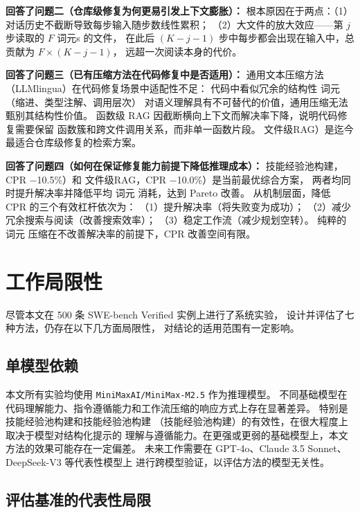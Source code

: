 \textbf{回答了问题二（仓库级修复为何更易引发上下文膨胀）：}
根本原因在于两点：（1）对话历史不截断导致每步输入随步数线性累积；
（2）大文件的放大效应——第 $j$ 步读取的 $F$ 词元s 的文件，
在此后 $(K-j-1)$ 步中每步都会出现在输入中，总贡献为 $F \times (K-j-1)$，
远超一次阅读本身的代价。

\textbf{回答了问题三（已有压缩方法在代码修复中是否适用）：}
通用文本压缩方法（LLMlingua）在代码修复场景中适配性不足：
代码中看似冗余的结构性 词元（缩进、类型注解、调用层次）
对语义理解具有不可替代的价值，通用压缩无法甄别其结构性价值。
函数级 RAG 因截断横向上下文而解决率下降，说明代码修复需要保留
函数簇和跨文件调用关系，而非单一函数片段。
文件级RAG）是迄今最适合仓库级修复的检索方案。

\textbf{回答了问题四（如何在保证修复能力前提下降低推理成本）：}
技能经验池构建，CPR $-$10.5\%）和
文件级RAG，CPR $-$10.0\%）是当前最优综合方案，
两者均同时提升解决率并降低平均 词元 消耗，达到 Pareto 改善。
从机制层面，降低 CPR 的三个有效杠杆依次为：
（1）提升解决率（将失败变为成功）；
（2）减少冗余搜索与阅读（改善搜索效率）；
（3）稳定工作流（减少规划空转）。
纯粹的 词元 压缩在不改善解决率的前提下，CPR 改善空间有限。


\section{工作局限性}
\label{sec:limitations}

尽管本文在 500 条 SWE-bench Verified 实例上进行了系统实验，
设计并评估了七种方法，仍存在以下几方面局限性，
对结论的适用范围有一定影响。

\subsection{单模型依赖}
\label{subsec:limit-single-model}

本文所有实验均使用 \texttt{MiniMaxAI/MiniMax-M2.5} 作为推理模型。
不同基础模型在代码理解能力、指令遵循能力和工作流压缩的响应方式上存在显著差异。
特别是技能经验池构建和技能经验池构建
（技能经验池构建）的有效性，在很大程度上取决于模型对结构化提示的
理解与遵循能力。在更强或更弱的基础模型上，本文方法的效果可能存在一定偏差。
未来工作需要在 GPT-4o、Claude 3.5 Sonnet、DeepSeek-V3 等代表性模型上
进行跨模型验证，以评估方法的模型无关性。

\subsection{评估基准的代表性局限}
\label{subsec:limit-benchmark}

